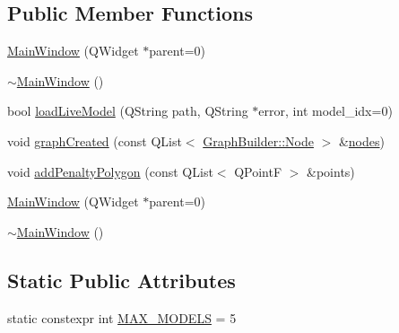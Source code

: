 \subsection*{Public Member Functions}
\begin{DoxyCompactItemize}
\item 
\mbox{\hyperlink{class_main_window_a8b244be8b7b7db1b08de2a2acb9409db}{Main\+Window}} (Q\+Widget $\ast$parent=0)
\item 
\mbox{\hyperlink{class_main_window_ae98d00a93bc118200eeef9f9bba1dba7}{$\sim$\+Main\+Window}} ()
\item 
bool \mbox{\hyperlink{class_main_window_a07658e8b85d5f8b9fd11d7f0c40bd22c}{load\+Live\+Model}} (Q\+String path, Q\+String $\ast$error, int model\+\_\+idx=0)
\item 
void \mbox{\hyperlink{class_main_window_a3f07463bdfda34bc0f3bc566759e1823}{graph\+Created}} (const Q\+List$<$ \mbox{\hyperlink{class_graph_builder_1_1_node}{Graph\+Builder\+::\+Node}} $>$ \&\mbox{\hyperlink{thread__vessels_8cpp_ace5675146c8515428d094fd142d8a2d2}{nodes}})
\item 
void \mbox{\hyperlink{class_main_window_a5cbafb7391e6b192655aef23f2443e7e}{add\+Penalty\+Polygon}} (const Q\+List$<$ Q\+PointF $>$ \&points)
\item 
\mbox{\hyperlink{class_main_window_a8b244be8b7b7db1b08de2a2acb9409db}{Main\+Window}} (Q\+Widget $\ast$parent=0)
\item 
\mbox{\hyperlink{class_main_window_ae98d00a93bc118200eeef9f9bba1dba7}{$\sim$\+Main\+Window}} ()
\end{DoxyCompactItemize}
\subsection*{Static Public Attributes}
\begin{DoxyCompactItemize}
\item 
static constexpr int \mbox{\hyperlink{class_main_window_a9d723d93888cfb94b48988f7d20e384e}{M\+A\+X\+\_\+\+M\+O\+D\+E\+LS}} = 5
\end{DoxyCompactItemize}
